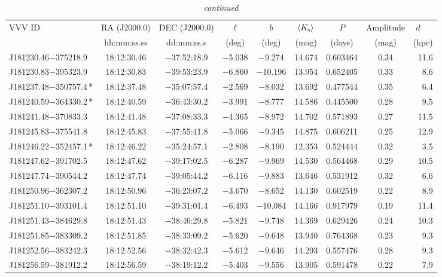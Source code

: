 \begin{table*}
\centering
\caption[]{{\it continued}}
\begin{tabular}{lcccccccr}
\hline \hline
VVV ID & RA (J2000.0)  & DEC (J2000.0) & $\ell$ & $b$ &  $\langle K_{\rm s} \rangle$ & $P$ & Amplitude & $d$~~~ \\
     & hh:mm:ss.ss    & dd:mm:ss.s   &  (deg) & (deg) &   (mag)       & (days) & (mag) & (kpc)   \\
\hline
J181230.46$-$375218.9 & 18:12:30.46 & $-$37:52:18.9 & $-$5.038 & $-$9.274 & 14.674 & 0.603464 & 0.34 & 11.6 \\
J181230.83$-$395323.9 & 18:12:30.83 & $-$39:53:23.9 & $-$6.860 & $-$10.196 & 13.954 & 0.652405 & 0.33 & 8.6 \\
J181237.48$-$350757.4\,* & 18:12:37.48 & $-$35:07:57.4 & $-$2.569 & $-$8.032 & 13.692 & 0.477544 & 0.35 & 6.4 \\
J181240.59$-$364330.2\,* & 18:12:40.59 & $-$36:43:30.2 & $-$3.991 & $-$8.777 & 14.586 & 0.445500 & 0.28 & 9.5 \\
J181241.48$-$370833.3 & 18:12:41.48 & $-$37:08:33.3 & $-$4.365 & $-$8.972 & 14.702 & 0.571893 & 0.27 & 11.5 \\
J181245.83$-$375541.8 & 18:12:45.83 & $-$37:55:41.8 & $-$5.066 & $-$9.345 & 14.875 & 0.606211 & 0.25 & 12.9 \\
J181246.22$-$352457.1\,* & 18:12:46.22 & $-$35:24:57.1 & $-$2.808 & $-$8.190 & 12.353 & 0.524444 & 0.32 & 3.5 \\
J181247.62$-$391702.5 & 18:12:47.62 & $-$39:17:02.5 & $-$6.287 & $-$9.969 & 14.530 & 0.564468 & 0.29 & 10.5 \\
J181247.74$-$390544.2 & 18:12:47.74 & $-$39:05:44.2 & $-$6.116 & $-$9.883 & 13.646 & 0.531912 & 0.32 & 6.6 \\
J181250.96$-$362307.2 & 18:12:50.96 & $-$36:23:07.2 & $-$3.670 & $-$8.652 & 14.130 & 0.602519 & 0.22 & 8.9 \\
J181251.10$-$393101.4 & 18:12:51.10 & $-$39:31:01.4 & $-$6.493 & $-$10.084 & 14.166 & 0.917979 & 0.19 & 11.4 \\
J181251.43$-$384629.8 & 18:12:51.43 & $-$38:46:29.8 & $-$5.821 & $-$9.748 & 14.369 & 0.629426 & 0.24 & 10.3 \\
J181251.85$-$383309.2 & 18:12:51.85 & $-$38:33:09.2 & $-$5.620 & $-$9.648 & 13.940 & 0.764368 & 0.23 & 9.3 \\
J181252.56$-$383242.3 & 18:12:52.56 & $-$38:32:42.3 & $-$5.612 & $-$9.646 & 14.293 & 0.557476 & 0.28 & 9.3 \\
J181256.59$-$381912.2 & 18:12:56.59 & $-$38:19:12.2 & $-$5.403 & $-$9.556 & 13.905 & 0.591478 & 0.22 & 7.9 \\

\end{tabular}
\end{table*}
